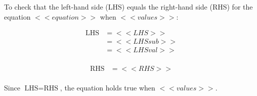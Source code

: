 \noindent{(\theminipagecount)}\hspace{0.1mm} %
\begin{minipage}[t]{0.99\textwidth} %
    To check that the left-hand side (LHS) equals the right-hand side (RHS) for the equation \( <<equation>> \) when \( <<values>> \):

    \begin{multicols}{2}
    \noindent
    \begin{align*}
    \text{LHS} &= <<LHS>> \\
               &= <<LHSsub>> \\
               &= <<LHSval>> \\
    \end{align*}

    \columnbreak

    \noindent
    \begin{align*}
    \text{RHS} &= <<RHS>> \\
    \end{align*}
    \end{multicols}

    Since \(\text{LHS} = \text{RHS}\), the equation holds true when \( <<values>> \).

\end{minipage}
